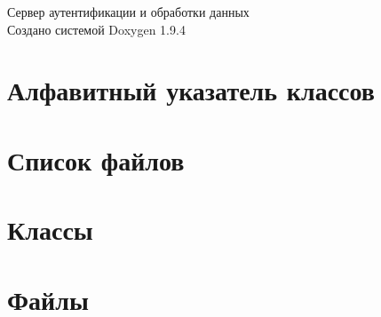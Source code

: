 \documentclass[twoside]{book}
\newcommand{\+}{\discretionary{\mbox{\scriptsize$\hookleftarrow$}}{}{}}
\newcommand{\clearemptydoublepage}{%
    \newpage{\pagestyle{empty}\cleardoublepage}%
  }
\begin{document}
  \raggedbottom
    \hypersetup{pageanchor=false,
                bookmarksnumbered=true,
                pdfencoding=unicode
               }
  \begin{titlepage}
  \vspace*{7cm}
  \begin{center}%
  {\Large Сервер аутентификации и обработки данных}\\
  \vspace*{1cm}
  {\large Создано системой Doxygen 1.9.4}\\
  \end{center}
  \end{titlepage}
  \clearemptydoublepage
  \tableofcontents
  \clearemptydoublepage
  \hypersetup{pageanchor=true}
\chapter{Алфавитный указатель классов}

\chapter{Список файлов}

\chapter{Классы}







\chapter{Файлы}






















  \backmatter
  \newpage
  \clearemptydoublepage
  \printindex
\end{document}
